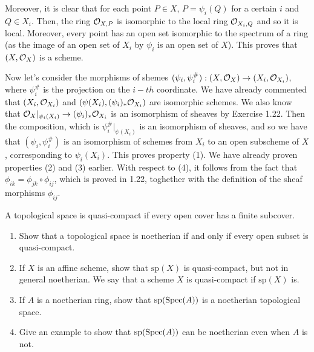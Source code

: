 \begin{sol}
	Moreover, it is clear that for each point $P \in X$, $P = \psi_i(Q)$ for a certain $i$ and $Q \in X_i$. Then, the ring $\mathcal{O}_{X,P}$ is isomorphic to the local ring $\mathcal{O}_{X_i, Q}$ and so it is local. Moreover, every point has an open set isomorphic to the spectrum of a ring (as the image of an open set of $X_i$ by $\psi_i$ is an open set of $X$). This proves that $(X, \mathcal{O}_X)$ is a scheme.

	\vspace{3mm}

	Now let's consider the morphisms of shemes $(\psi_i, \psi_i^{\#}): (X, \mathcal{O}_X) \to (X_i, \mathcal{O}_{X_i})$, where $\psi_i^{\#}$ is the projection on the $i-th$ coordinate. We have already commented that $(X_i, \mathcal{O}_{X_i})$ and $(\psi(X_i), (\psi_i)_*\mathcal{O}_{X_i})$ are isomorphic schemes. We also know that $\mathcal{O}_{X}|_{\psi_i(X_i)} \to (\psi_i)_*\mathcal{O}_{X_i}$ is an isomorphism of sheaves by Exercise 1.22. Then the composition, which is $\psi_i^{\#}|_{\psi(X_i)}$ is an isomorphism of sheaves, and so we have that $(\psi_i, \psi_i^{\#})$ is an isomorphism of schemes from $X_i$ to an open subscheme of $X$, corresponding to $\psi_i(X_i)$. This proves property (1). We have already proven properties (2) and (3) earlier. With respect to (4), it follows from the fact that $\phi_{ik} = \phi_{jk} \circ \phi_{ij}$, which is proved in 1.22, toghether with the definition of the sheaf morphisms $\phi_{ij}$. 
\end{sol}

\begin{ex}
	A topological space is quasi-compact if every open cover has a finite subcover. 
	\begin{enumerate}[label=\alph*)]
		\item Show that a topological space is noetherian if and only if every open subset is quasi-compact.
		\item If $X$ is an affine scheme, show that $\mathrm{sp}(X)$ is quasi-compact, but not in general noetherian. We say that a scheme $X$ is quasi-compact if $\mathrm{sp}(X)$ is.
		\item If $A$ is a noetherian ring, show that $\mathrm{sp}(\mathrm{Spec}(A))$ is a noetherian topological space.
		\item Give an example to show that $\mathrm{sp}(\mathrm{Spec}(A))$ can be noetherian even when $A$ is not.
	\end{enumerate}
\end{ex}

